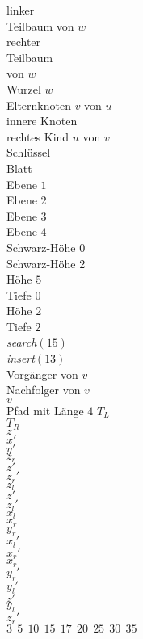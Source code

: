 \documentclass[a4paper,12pt]{article}
\begin{document}
\raggedright
\color{black}
linker\\ Teilbaum von $w$\\
rechter\\ Teilbaum \\ von $w$\\
Wurzel $w$\\
Elternknoten $v$ von $u$\\
innere Knoten\\
rechtes Kind $u$ von $v$\\
Schlüssel\\
Blatt\\
Ebene $1$ \\
Ebene $2$ \\  
Ebene $3$ \\  
Ebene $4$ \\
Schwarz-Höhe 0\\
Schwarz-Höhe 2\\
Höhe $5$\\
Tiefe $0$\\
Höhe $2$\\
Tiefe $2$\\
\textit{search}$\left(15\right)$\\
\textit{insert}$\left(13\right)$\\
Vorgänger von $v$\\
Nachfolger von $v$\\
$v$\\
Pfad mit Länge $4$
\color{Black}
$T_L$\\
$T_R$\\
$z$\\
$x'$\\
$y'$\\
$z_r$\\
$z'$\\
${z_r}'$\\
$z_l$\\
$z'$\\
${z_l}'$\\
$x_l$\\
$x_r$\\
$y_r$\\
${x_l}'$\\
${x_r}'$\\
${x_r}$\\
${y_r}'$\\
${y_l}'$\\
$z'$\\
${y_l}$\\
${z_r}'$\\
$3~~5~~10~~15~~17~~20~~25~~30~~35$ \\
\end{document}
